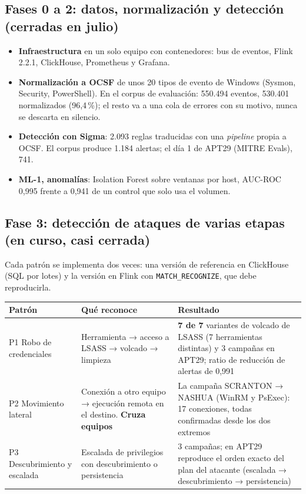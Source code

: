 \documentclass[11pt,a4paper]{article}
\newcommand{\cod}[1]{\texttt{\small #1}}
\begin{document}
\subsection{Fases 0 a 2: datos, normalización y detección (cerradas en julio)}
\begin{itemize}[leftmargin=*,itemsep=2pt]
  \item \textbf{Infraestructura} en un solo equipo con contenedores: bus de eventos, Flink 2.2.1, ClickHouse,
        Prometheus y Grafana.
  \item \textbf{Normalización a OCSF} de unos 20 tipos de evento de Windows (Sysmon, Security, PowerShell). En el
        corpus de evaluación: 550.494 eventos, 530.401 normalizados (96,4\,\%); el resto va a una cola de errores con
        su motivo, nunca se descarta en silencio.
  \item \textbf{Detección con Sigma}: 2.093 reglas traducidas con una \emph{pipeline} propia a OCSF. El corpus produce
        1.184 alertas; el día 1 de APT29 (MITRE Evals), 741.
  \item \textbf{ML-1, anomalías}: Isolation Forest sobre ventanas por host, AUC-ROC 0,995 frente a 0,941 de un
        control que solo usa el volumen.
\end{itemize}

\subsection{Fase 3: detección de ataques de varias etapas (en curso, casi cerrada)}
Cada patrón se implementa dos veces: una versión de referencia en ClickHouse (SQL por lotes) y la versión en
Flink con \cod{MATCH\_RECOGNIZE}, que debe reproducirla.

\begin{center}
\small
\begin{tabularx}{\textwidth}{@{}l X X@{}}
\toprule
\textbf{Patrón} & \textbf{Qué reconoce} & \textbf{Resultado} \\
\midrule
P1 Robo de credenciales & Herramienta → acceso a LSASS → volcado → limpieza & \textbf{7 de 7} variantes de volcado de
LSASS (7 herramientas distintas) y 3 campañas en APT29; ratio de reducción de alertas de 0,991 \\
P2 Movimiento lateral & Conexión a otro equipo → ejecución remota en el destino. \textbf{Cruza equipos} & La campaña
SCRANTON → NASHUA (WinRM y PsExec): 17 conexiones, todas confirmadas desde los dos extremos \\
P3 Descubrimiento y escalada & Escalada de privilegios con descubrimiento o persistencia & 3 campañas; en APT29
reproduce el orden exacto del plan del atacante (escalada → descubrimiento → persistencia) \\
\bottomrule
\end{tabularx}
\end{center}
\end{document}
